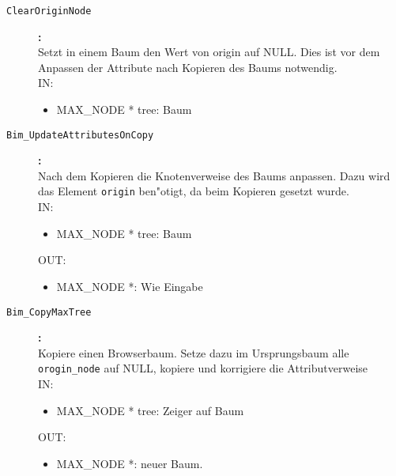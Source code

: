 \begin{description}
\item[\tt ClearOriginNode
]{\bf :\\}
Setzt in einem Baum den Wert von origin auf NULL. Dies ist
 vor dem Anpassen der Attribute nach Kopieren des Baums
 notwendig.
  \\
IN:
\begin{itemize}
   \item MAX\_NODE * tree: Baum

\end{itemize}
\item[\tt Bim\_UpdateAttributesOnCopy
]{\bf :\\}
Nach dem Kopieren die Knotenverweise des Baums anpassen. Dazu
 wird das Element {\tt origin} ben"otigt, da\3 beim Kopieren gesetzt
 wurde.
  \\
IN:
\begin{itemize}
   \item MAX\_NODE * tree: Baum

\end{itemize}
OUT:
\begin{itemize}
   \item MAX\_NODE *: Wie Eingabe

\end{itemize}

\item[\tt Bim\_CopyMaxTree
]{\bf :\\}
Kopiere einen Browserbaum. Setze dazu im Ursprungsbaum alle
 {\tt orogin\_node} auf NULL, kopiere und korrigiere die Attributverweise
  \\
IN:
\begin{itemize}
   \item MAX\_NODE * tree: Zeiger auf Baum

\end{itemize}
OUT:
\begin{itemize}
   \item MAX\_NODE *: neuer Baum.

\end{itemize}
\end{description}
